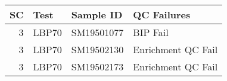 \begin{tabular}{|r|l|l|l|}
\hline
\rowcolor[gray]{.85}\textbf{SC} & \textbf{Test} & \textbf{Sample ID} & \textbf{         QC Failures }\\ \hline
  3 &  LBP70 &  SM19501077 &            BIP Fail \\ \hline
  3 &  LBP70 &  SM19502130 &  Enrichment QC Fail \\ \hline
  3 &  LBP70 &  SM19502173 &  Enrichment QC Fail \\ \hline
\end{tabular}
